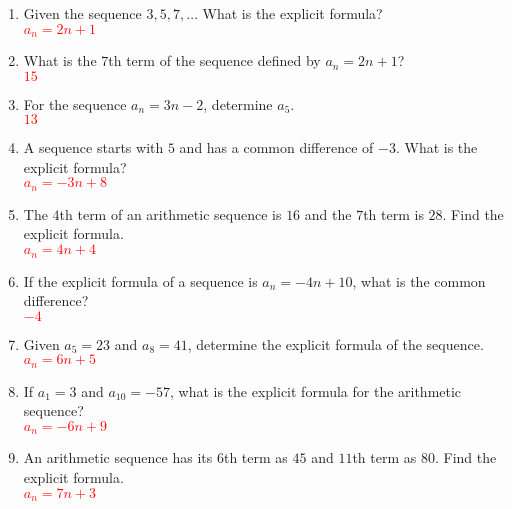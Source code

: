\documentclass{article}
\begin{document}
\begin{enumerate}[itemsep=2em]
    \item Given the sequence $3, 5, 7, \ldots$ What is the explicit formula? \\
    \textcolor{red}{$a_n = 2n + 1$}
    
    \item What is the $7$th term of the sequence defined by $a_n = 2n + 1$? \\
    \textcolor{red}{$15$}
    
    \item For the sequence $a_n = 3n - 2$, determine $a_5$. \\
    \textcolor{red}{$13$}
    
    \item A sequence starts with $5$ and has a common difference of $-3$. What is the explicit formula? \\
    \textcolor{red}{$a_n = -3n + 8$}
    
    \item The $4$th term of an arithmetic sequence is $16$ and the $7$th term is $28$. Find the explicit formula. \\
    \textcolor{red}{$a_n = 4n + 4$}
    
    \item If the explicit formula of a sequence is $a_n = -4n + 10$, what is the common difference? \\
    \textcolor{red}{$-4$}
    
    \item Given $a_5 = 23$ and $a_8 = 41$, determine the explicit formula of the sequence. \\
    \textcolor{red}{$a_n = 6n + 5$}
    
    \item If $a_1 = 3$ and $a_10 = -57$, what is the explicit formula for the arithmetic sequence? \\
    \textcolor{red}{$a_n = -6n + 9$}
    
    \item An arithmetic sequence has its $6$th term as $45$ and $11$th term as $80$. Find the explicit formula. \\
    \textcolor{red}{$a_n = 7n + 3$}
\end{enumerate}
\end{document}

